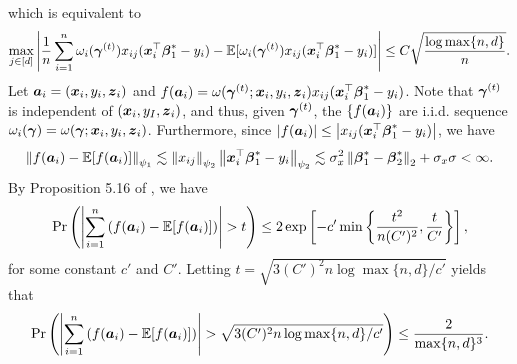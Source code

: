 	which is equivalent to 
	\begin{equation*}
		\max_{j \in [d]} \left\lvert \frac{1}{n}\sum_{i=1}^n \omega_i(\boldsymbol{\gamma}^{(t)}) x_{ij} ( \boldsymbol{x}_i^\top \boldsymbol{\beta}_1^* - y_i) 
			- \mathbb{E}[ \omega_i(\boldsymbol{\gamma}^{(t)}) x_{ij} ( \boldsymbol{x}_i^\top \boldsymbol{\beta}_1^* - y_i) ] \right\rvert \le  C \sqrt{ \frac{\log \max\{n, d\}}{n} } .
	\end{equation*}
	Let $\boldsymbol{a}_{i} = (\boldsymbol{x}_i, y_i, \boldsymbol{z}_i)$ and $f(\boldsymbol{a}_{i})=\omega(\boldsymbol{\gamma}^{(t)};\boldsymbol{x}_i, y_i, \boldsymbol{z}_i) x_{ij} ( \boldsymbol{x}_i^\top \boldsymbol{\beta}_1^* - y_i)$. 
	Note that $\boldsymbol{\gamma}^{(t)}$ is independent of $(\boldsymbol{x}_i, y_I, \boldsymbol{z}_i)$, and thus, given $\boldsymbol{\gamma}^{(t)}$, the $\{f(\boldsymbol{a}_{i})\}$ are i.i.d. sequence $\omega_i(\boldsymbol{\gamma})=\omega(\boldsymbol{\gamma};\boldsymbol{x}_i, y_i, \boldsymbol{z}_i)$. Furthermore, since $\left\lvert f(\boldsymbol{a}_i)\right\rvert \leq \left\lvert x_{ij}(\boldsymbol{x}_i^\top \boldsymbol{\beta}_1^* - y_i)\right\rvert$, we have
	\[\left\lVert f(\boldsymbol{a}_i)-\mathbb{E}[f(\boldsymbol{a}_i)]\right\rVert_{\psi_{1}} \lesssim \left\lVert x_{ij}\right\rVert_{\psi_2}\left\lVert\boldsymbol{x}_i^\top \boldsymbol{\beta}_1^* - y_i\right\rVert_{\psi_{2}} \lesssim \sigma_x^2\left\lVert\boldsymbol{\beta}_1^*-\boldsymbol{\beta}_2^*\right\rVert_2+\sigma_x\sigma < \infty.\]
	By Proposition 5.16 of \cite{vershynin2010introduction}, we have
	\[\Pr\left( \left\lvert\sum_{i=1}^n \left(f(\boldsymbol{a}_i)-\mathbb{E}[f(\boldsymbol{a}_i)]\right)\right\rvert > t \right) \leq 2\exp\left[ -c'\min\left\{\frac{t^2}{n(C')^2}, \frac{t}{C'}\right\} \right],\]
	for some constant $c'$ and $C'$. Letting $t = \sqrt{3(C')^2n \log \max\{n, d\}/c'}$ yields that 
	\[\Pr\left( \left\lvert\sum_{i=1}^n \left(f(\boldsymbol{a}_i)-\mathbb{E}[f(\boldsymbol{a}_i)]\right)\right\rvert > \sqrt{3(C')^2n \log \max\{n, d\}/c'} \right) \leq \frac{2}{\max\{n, d\}^3}.\]
	

